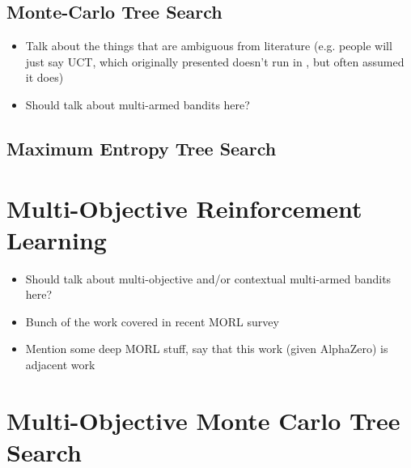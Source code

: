 
    \subsection{Monte-Carlo Tree Search}
    \label{sec:3-2-2-mcts}

        \begin{itemize}
            \item Talk about the things that are ambiguous from literature (e.g. people will just say UCT, which originally presented doesn't run in \mctsmode, but often assumed it does)
            \item Should talk about multi-armed bandits here?
        \end{itemize}
    
    \subsection{Maximum Entropy Tree Search}
    \label{sec:3-2-3-ments}


\section{Multi-Objective Reinforcement Learning}
\label{sec:3-3-morl}

    \begin{itemize}
        \item Should talk about multi-objective and/or contextual multi-armed bandits here?
        \item Bunch of the work covered in recent MORL survey \cite{morl_survey}
        \item Mention some deep MORL stuff, say that this work (given AlphaZero) is adjacent work
    \end{itemize}

\section{Multi-Objective Monte Carlo Tree Search}
\label{sec:3-4-momcts}


